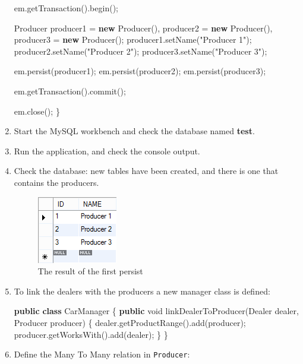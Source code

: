 \documentclass[]{report}
\newenvironment{Shaded}{}{}
\newcommand{\KeywordTok}[1]{\textcolor[rgb]{0.00,0.44,0.13}{\textbf{{#1}}}}
\newcommand{\DataTypeTok}[1]{\textcolor[rgb]{0.56,0.13,0.00}{{#1}}}
\newcommand{\StringTok}[1]{\textcolor[rgb]{0.25,0.44,0.63}{{#1}}}
\newcommand{\FunctionTok}[1]{\textcolor[rgb]{0.02,0.16,0.49}{{#1}}}
\newcommand{\NormalTok}[1]{{#1}}
\let\Oldincludegraphics\includegraphics
\renewcommand{\includegraphics}[1]{
\begin{adjustbox}{max size={\textwidth}{\textheight}}
    \Oldincludegraphics[scale=0.6]{#1}%
\end{adjustbox}
}
\begin{document}
\begin{enumerate}
\begin{Shaded}
\begin{Highlighting}[]
    \NormalTok{em.}\FunctionTok{getTransaction}\NormalTok{().}\FunctionTok{begin}\NormalTok{();}

    \NormalTok{Producer}
        \NormalTok{producer1 = }\KeywordTok{new} \FunctionTok{Producer}\NormalTok{(),}
        \NormalTok{producer2 = }\KeywordTok{new} \FunctionTok{Producer}\NormalTok{(),}
        \NormalTok{producer3 = }\KeywordTok{new} \FunctionTok{Producer}\NormalTok{();}
    \NormalTok{producer1.}\FunctionTok{setName}\NormalTok{(}\StringTok{"Producer 1"}\NormalTok{);}
    \NormalTok{producer2.}\FunctionTok{setName}\NormalTok{(}\StringTok{"Producer 2"}\NormalTok{);}
    \NormalTok{producer3.}\FunctionTok{setName}\NormalTok{(}\StringTok{"Producer 3"}\NormalTok{);}

    \NormalTok{em.}\FunctionTok{persist}\NormalTok{(producer1);}
    \NormalTok{em.}\FunctionTok{persist}\NormalTok{(producer2);}
    \NormalTok{em.}\FunctionTok{persist}\NormalTok{(producer3);}

    \NormalTok{em.}\FunctionTok{getTransaction}\NormalTok{().}\FunctionTok{commit}\NormalTok{();}

    \NormalTok{em.}\FunctionTok{close}\NormalTok{();}
\NormalTok{\}}
\end{Highlighting}
\end{Shaded}
\item
  Start the MySQL workbench and check the database named \textbf{test}.
\item
  Run the application, and check the console output.
\item
  Check the database: new tables have been created, and there is one
  that contains the producers.

  \begin{figure}[htbp]
  \centering
  \includegraphics{img/codegen/dbresult1.png}
  \caption{The result of the first persist}
  \end{figure}
\item
  To link the dealers with the producers a new manager class is defined:

\begin{Shaded}
\begin{Highlighting}[]
\KeywordTok{public} \KeywordTok{class} \NormalTok{CarManager \{}
    \KeywordTok{public} \DataTypeTok{void} \FunctionTok{linkDealerToProducer}\NormalTok{(Dealer dealer, Producer producer) \{}
        \NormalTok{dealer.}\FunctionTok{getProductRange}\NormalTok{().}\FunctionTok{add}\NormalTok{(producer);}
        \NormalTok{producer.}\FunctionTok{getWorksWith}\NormalTok{().}\FunctionTok{add}\NormalTok{(dealer);}
    \NormalTok{\}}
\NormalTok{\}}
\end{Highlighting}
\end{Shaded}
\item
  Define the Many To Many relation in \texttt{Producer}:


\end{enumerate}
\end{document}
